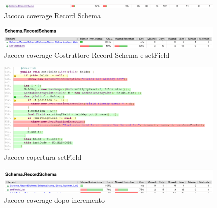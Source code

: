 \documentclass[12pt, a4paper]{article}
\begin{document}
  \begin{figure}
    \includegraphics[width=\linewidth]{./images/create_record/JacocoCoverage2.png}
    \caption{Jacoco coverage Record Schema}
    \label{fig:JacocoCoverageCreateRecord2}
  \end{figure}

  \begin{figure}
    \includegraphics[width=\linewidth]{./images/create_record/JacocoCoverage3.png}
    \caption{Jacoco coverage Costruttore Record Schema e setField}
    \label{fig:JacocoCoverageCreateRecord3}
  \end{figure}

  \begin{figure}
    \includegraphics[width=\linewidth]{./images/create_record/JacocoCoverage4.png}
    \caption{Jacoco copertura setField}
    \label{fig:JacocoCoverageCreateRecord4}
  \end{figure}

  \begin{figure}
    \includegraphics[width=\linewidth]{./images/create_record/JacocoCoverage5.png}
    \caption{Jacoco coverage dopo incremento}
    \label{fig:JacocoCoverageCreateRecord5}
  \end{figure}
\end{document}
